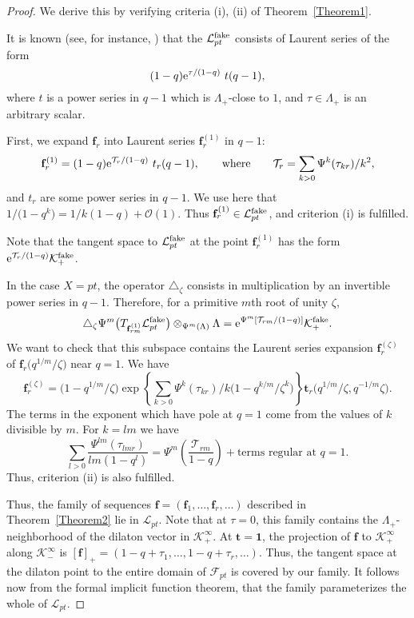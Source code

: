 \documentclass[pdftex]{sigma}
\def\F{\mathcal F}
\def\K{\mathcal K}
\def\L{\mathcal L}
\def\O{\mathcal O}
\def\T{\mathcal T}
\def\1{\mathbf 1}
\def\f{{\mathbf f}}
\def\t{{\mathbf t}}
\renewcommand{\Delta}{\triangle}
\begin{document}
\begin{proof}We derive this by verifying criteria (i), (ii) of Theorem~\ref{Theorem1}.

It is known (see, for instance, \cite{CGL}) that the $\L^{\rm fake}_{pt}$ consists of Laurent series of the form
\[ (1-q) {\rm e}^{\tau/(1-q)}\ t(q-1),\]
where $t$ is a power series in $q-1$ which is $\Lambda_{+}$-close to $1$, and
$\tau\in \Lambda_{+}$ is an arbitrary scalar.

First, we expand $\f_r$ into Laurent series $\f_r^{(1)}$ in $q-1$:
\[ \f_r^{(1)}= (1-q){\rm e}^{\T_r/(1-q)}\ t_r(q-1), \qquad \text{where}\qquad \T_r=\sum_{k>0}\Psi^k(\tau_{kr})/k^2,\]
and $t_r$ are some power series in $q-1$. We use here that $1/\big(1-q^k\big)=1/k(1-q)+\O(1)$. Thus $\f_r^{(1)}\in \L_{pt}^{\rm fake}$, and
criterion (i) is fulfilled.

Note that the tangent space to $\L_{pt}^{\rm fake}$ at the point $\f_r^{(1)}$ has the form ${\rm e}^{\T_r/(1-q)} \K_{+}^{\rm fake}$.

In the case $X=pt$, the operator
$\Delta_{\zeta}$ consists in multiplication by an invertible power series in $q-1$. Therefore, for a primitive $m$th root of unity $\zeta$,
\[ \Delta_{\zeta} \Psi^m\big(T_{\f_{rm}^{(1)}}\L_{pt}^{\rm fake}\big)\otimes_{\Psi^m(\Lambda)}\Lambda = {\rm e}^{\Psi^m[\T_{rm}/(1-q)]}\K^{\rm fake}_{+}.\]
We want to check that this subspace contains the Laurent series expansion $\f_r^{(\zeta)}$ of $\f_r\big(q^{1/m}/\zeta\big)$ near $q=1$. We have
\[ \f_r^{(\zeta)}=\big(1-q^{1/m}/\zeta\big)
\exp\left\{ \sum_{k>0} \Psi^k(\tau_{kr})/k\big(1-q^{k/m}/\zeta^k\big)\right\} \t_r\big(q^{1/m}/\zeta, q^{-1/m}\zeta\big).\]
The terms in the exponent which have pole at $q=1$ come from the values of $k$
divisible by $m$. For $k=lm$ we have
\[ \sum_{l>0} \frac{\Psi^{lm}(\tau_{lmr})}{lm(1-q^l)} = \Psi^m\left(\frac{\T_{rm}}{1-q}\right) + \text{terms regular at $q=1$}.\]
Thus, criterion (ii) is also fulfilled.

Thus, the family of sequences $\f=(\f_1,\dots,\f_r,\dots)$ described in Theorem~\ref{Theorem2} lie in $\L_{pt}$. Note that at $\tau = 0$, this family contains the $\Lambda_{+}$-neighborhood of the dilaton vector in $\K_{+}^{\infty}$. At $\t=\1$, the projection of $\f$ to $\K^{\infty}_{+}$ along $\K^{\infty}_{-}$ is
$[\f]_{+}=(1-q+\tau_1, \dots, 1-q+\tau_r,\dots)$. Thus, the tangent space at the dilaton point to the entire domain of $\F_{pt}$ is covered by our family. It follows now from the formal implicit function theorem, that the family parameterizes the whole of $\L_{pt}$.
\end{proof}
\end{document}
